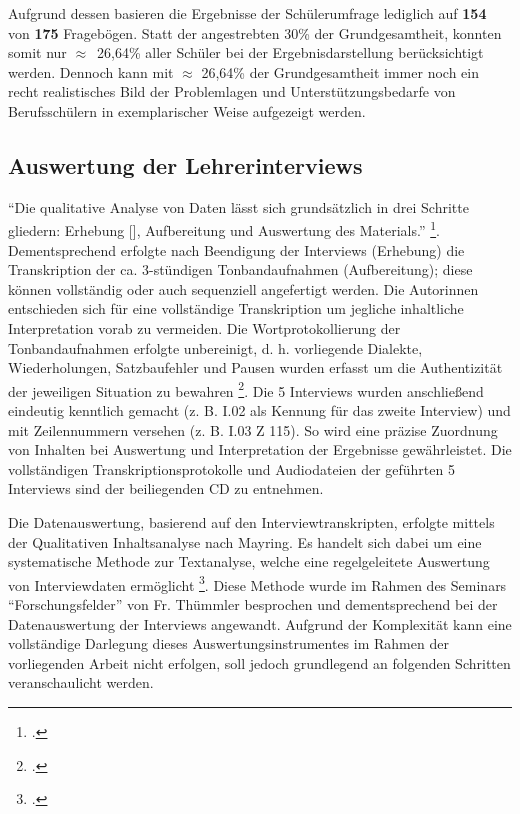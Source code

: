 Aufgrund dessen basieren die Ergebnisse der Schülerumfrage lediglich auf \textbf{154} von \textbf{175} Fragebögen. Statt der angestrebten 30\% der Grundgesamtheit, konnten somit nur \mbox{$\approx$ 26,64\%} aller Schüler bei der Ergebnisdarstellung berücksichtigt werden. Dennoch kann mit $\approx$ 26,64\% der Grundgesamtheit immer noch ein recht realistisches Bild der Problemlagen und Unterstützungsbedarfe von Berufsschülern in exemplarischer Weise aufgezeigt werden.

\subsection{Auswertung der Lehrerinterviews}
\label{sec:AuswertungDerLehrerinterviews}

"`Die qualitative Analyse von Daten lässt sich grundsätzlich in drei Schritte gliedern: Erhebung [\punkte], Aufbereitung und Auswertung des Materials."' \footcite[135]{Krueger2014}. Dementsprechend erfolgte nach Beendigung der Interviews (Erhebung) die Transkription der ca. 3-stündigen Tonbandaufnahmen (Aufbereitung); diese können vollständig oder auch sequenziell angefertigt werden. Die Autorinnen entschieden sich für eine vollständige Transkription um jegliche inhaltliche Interpretation vorab zu vermeiden. Die Wortprotokollierung der Tonbandaufnahmen erfolgte unbereinigt, d. h. vorliegende Dialekte, Wiederholungen, Satzbaufehler und Pausen wurden erfasst um die Authentizität der jeweiligen Situation zu bewahren \footcite[vgl.][136]{Krueger2014}. Die 5 Interviews wurden anschließend eindeutig kenntlich gemacht (z. B. I.02 als Kennung für das zweite Interview) und mit Zeilennummern versehen (z. B. I.03 Z 115). So wird eine präzise Zuordnung von Inhalten bei Auswertung und Interpretation der Ergebnisse gewährleistet. Die vollständigen Transkriptionsprotokolle und Audiodateien der geführten 5 Interviews sind der beiliegenden CD zu entnehmen.

Die Datenauswertung, basierend auf den Interviewtranskripten, erfolgte mittels der Qualitativen Inhaltsanalyse nach Mayring. Es handelt sich dabei um eine systematische Methode zur Textanalyse, welche eine regelgeleitete Auswertung von Interviewdaten ermöglicht \footcite[vgl.][133]{Krueger2014}. Diese Methode wurde im Rahmen des Seminars "`Forschungsfelder"' von Fr. Thümmler besprochen und dementsprechend bei der Datenauswertung der Interviews angewandt. Aufgrund der Komplexität kann eine vollständige Darlegung dieses Auswertungsinstrumentes im Rahmen der vorliegenden Arbeit nicht erfolgen, soll jedoch grundlegend an folgenden Schritten veranschaulicht werden.

